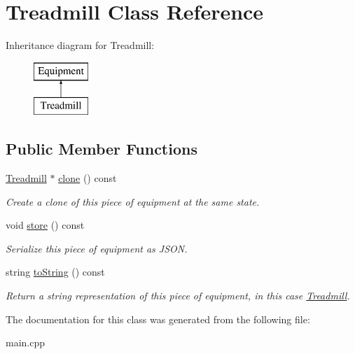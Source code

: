 \hypertarget{class_treadmill}{}\section{Treadmill Class Reference}
\label{class_treadmill}
Inheritance diagram for Treadmill\+:\begin{figure}[H]
\begin{center}
\leavevmode
\includegraphics[height=2.000000cm]{class_treadmill}
\end{center}
\end{figure}
\subsection*{Public Member Functions}
\begin{DoxyCompactItemize}
\item 
\hypertarget{class_treadmill_a3104f532767a01da7e48a9935242a032}{}\hyperlink{class_treadmill}{Treadmill} $\ast$ \hyperlink{class_treadmill_a3104f532767a01da7e48a9935242a032}{clone} () const \label{class_treadmill_a3104f532767a01da7e48a9935242a032}

\begin{DoxyCompactList}\small\item\em Create a clone of this piece of equipment at the same state. \end{DoxyCompactList}\item 
\hypertarget{class_treadmill_a62c7b79ca95f62d6ec3720cdaab9cbf0}{}void \hyperlink{class_treadmill_a62c7b79ca95f62d6ec3720cdaab9cbf0}{store} () const \label{class_treadmill_a62c7b79ca95f62d6ec3720cdaab9cbf0}

\begin{DoxyCompactList}\small\item\em Serialize this piece of equipment as J\+S\+O\+N. \end{DoxyCompactList}\item 
\hypertarget{class_treadmill_a695c6c44899532cb3505833f4d6dd031}{}string \hyperlink{class_treadmill_a695c6c44899532cb3505833f4d6dd031}{to\+String} () const \label{class_treadmill_a695c6c44899532cb3505833f4d6dd031}

\begin{DoxyCompactList}\small\item\em Return a string representation of this piece of equipment, in this case \textquotesingle{}\hyperlink{class_treadmill}{Treadmill}\textquotesingle{}. \end{DoxyCompactList}\end{DoxyCompactItemize}


The documentation for this class was generated from the following file\+:\begin{DoxyCompactItemize}
\item 
main.\+cpp\end{DoxyCompactItemize}
